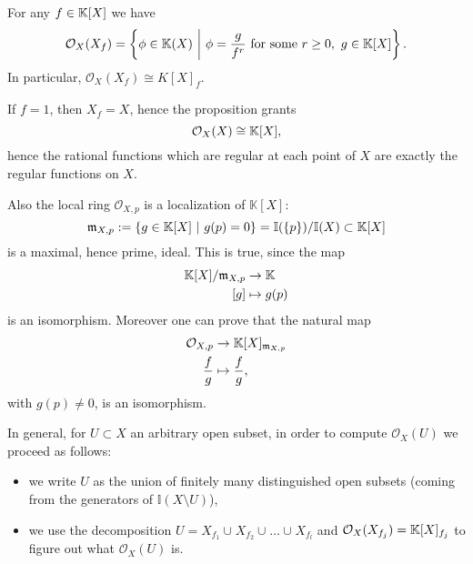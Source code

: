 \begin{prop}
	For any $f \in \mathbb{K}[X]$ we have
	\begin{equation}
		\mathcal{O}_X(X_f) = \left\{ \phi\in \K(X) \ \middle|\ \phi = \frac{g}{f^r} \text{ for some } r \geq 0,\ g \in \K[X] \right\}
	.\end{equation} 
	In particular, $\mathcal{O}_X(X_f) \cong K[X]_f$.
\end{prop} 
\begin{cor}
	If $f = 1$, then $X_f = X$, hence the proposition grants
	\begin{equation}
		\mathcal{O}_X(X) \cong \mathbb{K}[X]
	,\end{equation} 
	hence the rational functions which are regular at each point of $X$ are exactly the regular functions on  $X$.
\end{cor} 

\begin{rem}
	Also the local ring $\mathcal{O}_{X,p}$ is a localization of $\mathbb{K}\left[X\right]$:
	\begin{equation}
		\mathfrak{m}_{X,p} := \left\{ g \in \K[X] \ \middle|\ g(p) = 0 \right\} = \mathbb{I}(\{p\})/\mathbb{I}(X) \subset \K[X]
	\end{equation}
	is a maximal, hence prime, ideal.
	This is true, since the map
	\begin{align}
		\mathbb{K}[X]/\mathfrak{m}_{X,p} &\to \mathbb{K}\\
		\left[ g \right] &\mapsto g(p)
	\end{align} 
	is an isomorphism.
	Moreover one can prove that the natural map
	\begin{align}
		\mathcal{O}_{X,p} &\to \mathbb{K}[X]_{\mathfrak{m}_{X,p}}\\
		\frac{f}{g} &\mapsto \frac{f}{g}
	,\end{align} 
	with $g(p) \neq 0$, is an isomorphism.
\end{rem}

\begin{rem}
	In general, for $U \subset X$ an arbitrary open subset, in order to compute $\mathcal{O}_X(U)$ we proceed as follows:
	\begin{itemize}
		\item we write $U$ as the union of finitely many distinguished open subsets (coming from the generators of $\mathbb{I}(X\setminus U)$),
		\item we use the decomposition $U = X_{f_1} \cup_{} X_{f_2} \cup_{} \ldots \cup_{} X_{f_l}$ and $\mathcal{O}_X(X_{f_j}) = \mathbb{K}[X]_{f_j}$ to figure out what $\mathcal{O}_X(U)$ is.
	\end{itemize}
\end{rem}

